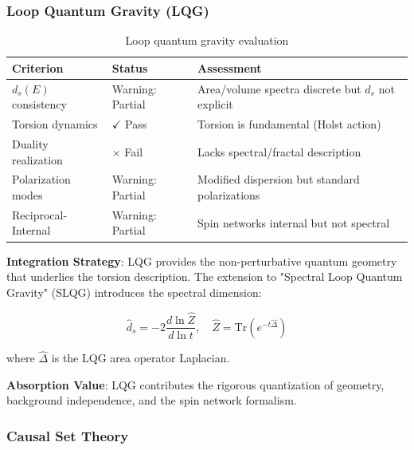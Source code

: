 \subsubsection{Loop Quantum Gravity (LQG)}

\begin{table}[h]
\centering
\begin{tabular}{p{3.5cm}p{2cm}p{6cm}}
\toprule
\textbf{Criterion} & \textbf{Status} & \textbf{Assessment} \\
\midrule
$d_s(E)$ consistency & Warning: Partial & Area/volume spectra discrete but $d_s$ not explicit \\
Torsion dynamics & $\checkmark$ Pass & Torsion is fundamental (Holst action) \\
Duality realization & $\times$ Fail & Lacks spectral/fractal description \\
Polarization modes & Warning: Partial & Modified dispersion but standard polarizations \\
Reciprocal-Internal & Warning: Partial & Spin networks internal but not spectral \\
\bottomrule
\end{tabular}
\caption{Loop quantum gravity evaluation}
\end{table}

\textbf{Integration Strategy}:
LQG provides the non-perturbative quantum geometry that underlies the torsion description. The extension to "Spectral Loop Quantum Gravity" (SLQG) introduces the spectral dimension:

\begin{equation}
    \hat{d}_s = -2 \frac{d\ln \hat{Z}}{d\ln t}, \quad \hat{Z} = \text{Tr}(e^{-t\hat{\Delta}})
\end{equation}

where $\hat{\Delta}$ is the LQG area operator Laplacian.

\textbf{Absorption Value}: LQG contributes the rigorous quantization of geometry, background independence, and the spin network formalism.

\subsubsection{Causal Set Theory}

